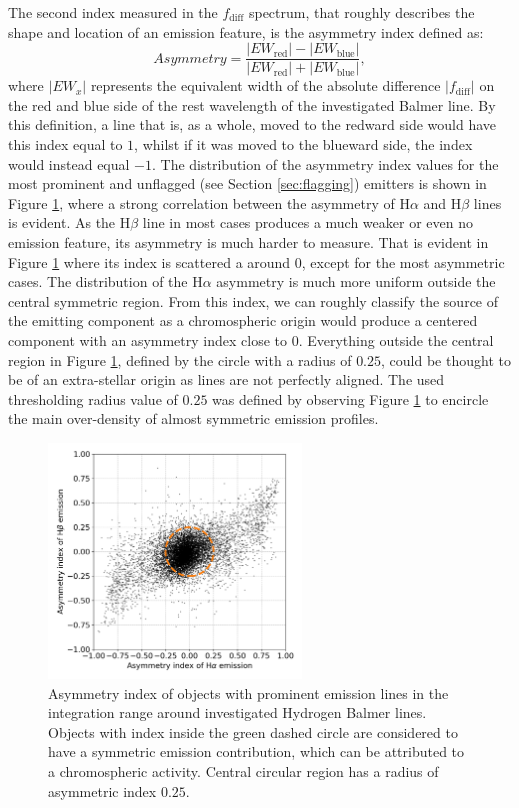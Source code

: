 The second index measured in the $f_\mathrm{diff}$ spectrum, that roughly describes the shape and location of an emission feature, is the asymmetry index defined as:
\begin{equation}
\label{equ:hab_asym}
Asymmetry = \frac{|EW_\mathrm{red}| - |EW_\mathrm{blue}|}{|EW_\mathrm{red}| + |EW_\mathrm{blue}|},
\end{equation}
where $|EW_x|$ represents the equivalent width of the absolute difference $|f_\mathrm{diff}|$ on the red and blue side of the rest wavelength of the investigated Balmer line. By this definition, a line that is, as a whole, moved to the redward side would have this index equal to $1$, whilst if it was moved to the blueward side, the index would instead equal $-1$. The distribution of the asymmetry index values for the most prominent and unflagged (see Section \ref{sec:flagging}) emitters is shown in Figure \ref{fig:hab_asym}, where a strong correlation between the asymmetry of H$\alpha$ and H$\beta$ lines is evident. As the H$\beta$ line in most cases produces a much weaker or even no emission feature, its asymmetry is much harder to measure. That is evident in Figure \ref{fig:hab_asym} where its index is scattered a around $0$, except for the most asymmetric cases. The distribution of the H$\alpha$ asymmetry is much more uniform outside the central symmetric region. From this index, we can roughly classify the source of the emitting component as a chromospheric origin would produce a centered component with an asymmetry index close to $0$. Everything outside the central region in Figure \ref{fig:hab_asym}, defined by the circle with a radius of $0.25$, could be thought to be of an extra-stellar origin as lines are not perfectly aligned. The used thresholding radius value of $0.25$ was defined by observing Figure \ref{fig:hab_asym} to encircle the main over-density of almost symmetric emission profiles.

\begin{figure}
	\centering
	\includegraphics[width=0.6\textwidth]{H_emission_asymmetry.png}
	\caption{Asymmetry index of objects with prominent emission lines in the integration range around investigated Hydrogen Balmer lines. Objects with index inside the green dashed circle are considered to have a symmetric emission contribution, which can be attributed to a chromospheric activity. Central circular region has a radius of asymmetric index $0.25$.}
	\label{fig:hab_asym}
\end{figure}

